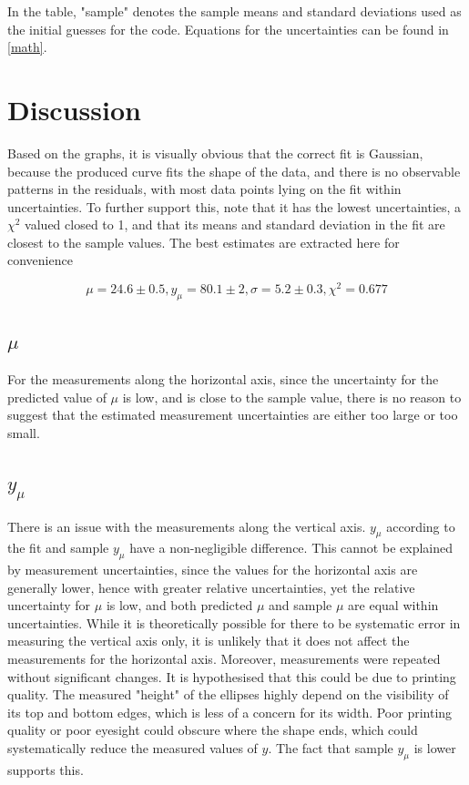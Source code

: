 \documentclass[12pt]{article}
\begin{document}
In the table, "sample" denotes the sample means and standard deviations used as the initial guesses for the code. Equations for the uncertainties can be found in \ref{math}.

\section{Discussion}

Based on the graphs, it is visually obvious that the correct fit is Gaussian, because the produced curve fits the shape of the data, and there is no observable patterns in the residuals, with most data points lying on the fit within uncertainties. To further support this, note that it has the lowest uncertainties, a $\chi^2$ valued closed to 1, and that its means and standard deviation in the fit are closest to the sample values. The best estimates are extracted here for convenience

$$\mu = 24.6 \pm 0.5, y_\mu = 80.1 \pm 2, \sigma = 5.2 \pm 0.3, \chi^2 = 0.677$$

\subsection{$\mu$}

For the measurements along the horizontal axis, since the uncertainty for the predicted value of $\mu$ is low, and is close to the sample value, there is no reason to suggest that the estimated measurement uncertainties are either too large or too small.

\subsection{$y_\mu$}\label{excuse}

There is an issue with the measurements along the vertical axis. $y_\mu$ according to the fit and sample $y_\mu$ have a non-negligible difference. This cannot be explained by measurement uncertainties, since the values for the horizontal axis are generally lower, hence with greater relative uncertainties, yet the relative uncertainty for $\mu$ is low, and both predicted $\mu$ and sample $\mu$ are equal within uncertainties. While it is theoretically possible for there to be systematic error in measuring the vertical axis only, it is unlikely that it does not affect the measurements for the horizontal axis. Moreover, measurements were repeated without significant changes. It is hypothesised that this could be due to printing quality. The measured "height" of the ellipses highly depend on the visibility of its top and bottom edges, which is less of a concern for its width. Poor printing quality or poor eyesight could obscure where the shape ends, which could systematically reduce the measured values of $y$. The fact that sample $y_\mu$ is lower supports this.
\end{document}
